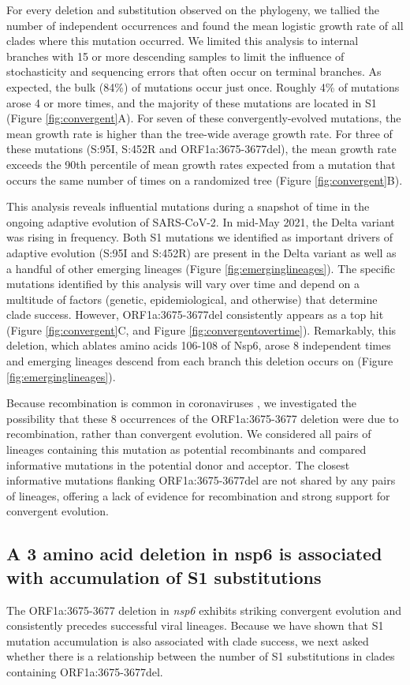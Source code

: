\documentclass[11pt,oneside,letterpaper]{article}
\begin{document}
For every deletion and substitution observed on the phylogeny, we tallied the number of independent occurrences and found the mean logistic growth rate of all clades where this mutation occurred. 
We limited this analysis to internal branches with 15 or more descending samples to limit the influence of stochasticity and sequencing errors that often occur on terminal branches. As expected, the bulk (84\%) of mutations occur just once. 
Roughly 4\% of mutations arose 4 or more times, and the majority of these mutations are located in S1 (Figure \ref{fig:convergent}A). 
For seven of these convergently-evolved mutations, the mean growth rate is higher than the tree-wide average growth rate. 
For three of these mutations (S:95I, S:452R and ORF1a:3675-3677del), the mean growth rate exceeds the 90th percentile of mean growth rates expected from a mutation that occurs the same number of times on a randomized tree (Figure \ref{fig:convergent}B).

This analysis reveals influential mutations during a snapshot of time in the ongoing adaptive evolution of SARS-CoV-2. 
In mid-May 2021, the Delta variant was rising in frequency. 
Both S1 mutations we identified as important drivers of adaptive evolution (S:95I and S:452R) are present in the Delta variant as well as a handful of other emerging lineages (Figure \ref{fig:emerginglineages}). 
The specific mutations identified by this analysis will vary over time and depend on a multitude of factors (genetic, epidemiological, and otherwise) that determine clade success. 
However, ORF1a:3675-3677del consistently appears as a top hit (Figure \ref{fig:convergent}C, and Figure \ref{fig:convergentovertime}). 
Remarkably, this deletion, which ablates amino acids 106-108 of Nsp6, arose 8 independent times and emerging lineages descend from each branch this deletion occurs on (Figure \ref{fig:emerginglineages}).

Because recombination is common in coronaviruses \cite{Muller2021-qq, Turkahia2021-ao}, we investigated the possibility that these 8 occurrences of the ORF1a:3675-3677 deletion were due to recombination, rather than convergent evolution. 
We considered all pairs of lineages containing this mutation as potential recombinants and compared informative mutations in the potential donor and acceptor. 
The closest informative mutations flanking ORF1a:3675-3677del are not shared by any pairs of lineages, offering a lack of evidence for recombination and strong support for convergent evolution.

\subsection*{A 3 amino acid deletion in nsp6 is associated with accumulation of S1 substitutions}
The ORF1a:3675-3677 deletion in \emph{nsp6} exhibits striking convergent evolution and consistently precedes successful viral lineages. Because we have shown that S1 mutation accumulation is also associated with clade success, we next asked whether there is a relationship between the number of S1 substitutions in clades containing ORF1a:3675-3677del.
\end{document}
